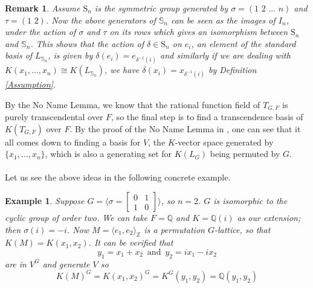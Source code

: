 \documentclass[12pt]{article}
\theoremstyle{plain}
\newtheorem{example}[theorem]{Example}
\newtheorem*{remark}{Remark}
\newcommand{\Z}{\ensuremath{\mathbb{Z}}}
\newcommand{\Q}{\ensuremath{\mathbb{Q}}}
\begin{document}
\begin{remark}\label{ActionSn}
  Assume $\mathrm{S}_n$ is the symmetric group generated by $\sigma =
  (1 \,\, 2 \,\, \ldots \,\, n)$ and $\tau = (1 \,\, 2)$. Now the
  above generators of $\mathbb{S}_n$ can be seen as the images of
  $I_n$, under the action of $\sigma$ and $\tau$ on its rows which
  gives an isomorphism between $\mathrm{S}_n$ and $\mathbb{S}_n$. This
  shows that the action of $\delta \in \mathrm{S}_n$ on $e_i$, an
  element of the standard basis of $L_{\mathbb{S}_n}$, is given by
  $\delta(e_i) = e_{\delta^{-1}(i)}$ and similarly if we are dealing
  with $K(x_1, \ldots , x_n ) \cong K(L_{\mathbb{S}_n})$, we have
  $\delta(x_i) = x_{\delta^{-1}(i)}$ by Definition \ref{Assumption}.
\end{remark}

By the No Name Lemma, we know that the rational function field of $T_{G,F}$ is purely transcendental over $F$, so the final step is to find a transcendence basis of $K(T_{G,F})$ over $F$. By the proof of the No Name Lemma in \cite{Lenstra}, one can see that it all comes down to finding a basis for $V$, the $K$-vector space generated by $\lbrace x_1, \ldots, x_n \rbrace$, which is also a generating set for $K(L_G)$ being permuted by $G$.\\
\\Let us see the above ideas in the following concrete example.
\begin{example}	
Suppose $G = \langle \sigma = \begin{bmatrix}
0&1\\
1&0
\end{bmatrix}\rangle$, so $n = 2$. $G$ is isomorphic to the cyclic group of order two. We can take $F = \Q$ and $K = \Q(i)$ as our extension; then $\sigma(i) = -i$. Now $M = \langle e_1, e_2 \rangle_{\Z}$ is a permutation $G$-lattice, so that $K(M) = K(x_1,x_2)$. It can be verified that $$y_1 = x_1+x_2\,\,\,  \textrm{and}\,\,\, y_2 = ix_1 -ix_2 $$ are in $V^G$ and generate $V$ so $$K(M)^G = K(x_1,x_2)^G = K^G(y_1,y_2) = \Q(y_1,y_2)$$
\end{example}
\end{document}

